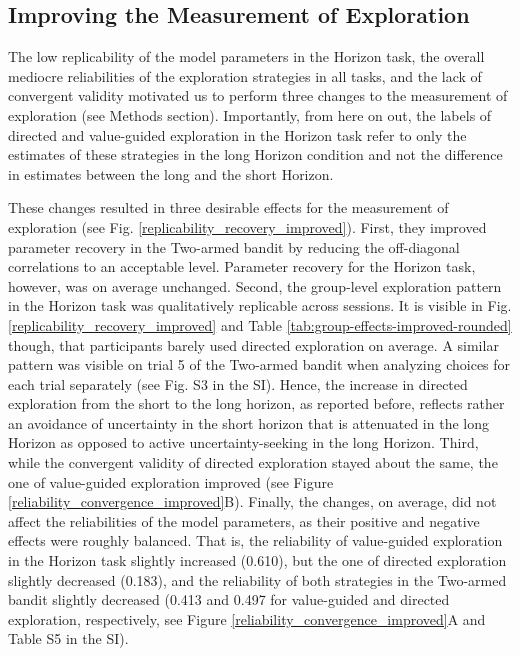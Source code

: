 \documentclass[fleqn,10pt]{wlscirep}
\begin{document}
\subsection*{Improving the Measurement of Exploration}
The low replicability of the model parameters in the Horizon task, the overall mediocre reliabilities of the exploration strategies in all tasks, and the lack of convergent validity motivated us to perform three changes to the measurement of exploration (see Methods section). Importantly, from here on out, the labels of directed and value-guided exploration in the Horizon task refer to only the estimates of these strategies in the long Horizon condition and not the difference in estimates between the long and the short Horizon.

These changes resulted in three desirable effects for the measurement of exploration (see Fig. \ref{replicability_recovery_improved}). First, they improved parameter recovery in the Two-armed bandit by reducing the off-diagonal correlations to an acceptable level. Parameter recovery for the Horizon task, however, was on average unchanged. Second, the group-level exploration pattern in the Horizon task was qualitatively replicable across sessions. It is visible in Fig. \ref{replicability_recovery_improved} and Table \ref{tab:group-effects-improved-rounded} though, that participants barely used directed exploration on average. A similar pattern was visible on trial 5 of the Two-armed bandit when analyzing choices for each trial separately (see Fig. S3 in the SI). Hence, the increase in directed exploration from the short to the long horizon, as reported before, reflects rather an avoidance of uncertainty in the short horizon that is attenuated in the long Horizon as opposed to active uncertainty-seeking in the long Horizon. Third, while the convergent validity of directed exploration stayed about the same, the one of value-guided exploration improved (see Figure \ref{reliability_convergence_improved}B). Finally, the changes, on average, did not affect the reliabilities of the model parameters, as their positive and negative effects were roughly balanced. That is, the reliability of value-guided exploration in the Horizon task slightly increased (0.610), but the one of directed exploration slightly decreased (0.183), and the reliability of both strategies in the Two-armed bandit slightly decreased (0.413 and 0.497 for value-guided and directed exploration, respectively, see Figure \ref{reliability_convergence_improved}A and Table S5 in the SI).
\end{document}

